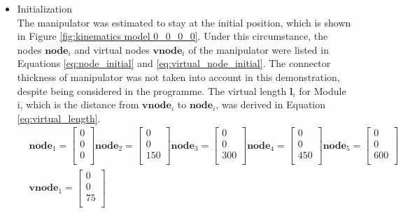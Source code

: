 \begin{itemize}
    \item Initialization \\
    The manipulator was estimated to stay at the initial position, which is shown in Figure 
    \ref{fig:kinematics model 0_0_0_0}. Under this circumstance, the nodes $\textbf{node}_{i}$ and 
    virtual nodes $\textbf{vnode}_{i}$ of the manipulator were listed in Equations \ref{eq:node_initial} and 
    \ref{eq:virtual_node_initial}. The connector thickness of manipulator was not taken into account in this 
    demonstration, despite being considered in the programme. The virtual length $\textbf{l}_{i}$ for Module i, which 
    is the distance from $\textbf{vnode}_{i}$ to $\textbf{node}_{i}$, was derived in Equation 
    \ref{eq:virtual_length}.
    \begin{align}
        & \textbf{node}_{1} = \begin{bmatrix} 0 \\ 0 \\ 0 \\ \end{bmatrix} 
        \textbf{node}_{2} = \begin{bmatrix} 0 \\ 0 \\ 150 \\ \end{bmatrix} 
        \textbf{node}_{3} = \begin{bmatrix} 0 \\ 0 \\ 300 \\ \end{bmatrix} 
        \textbf{node}_{4} = \begin{bmatrix} 0 \\ 0 \\ 450 \\ \end{bmatrix} 
        \textbf{node}_{5} = \begin{bmatrix} 0 \\ 0 \\ 600 \\ \end{bmatrix} 
        \label{eq:node_initial} \\
        &\textbf{vnode}_{1} = \begin{bmatrix} 0 \\ 0 \\ 75 \\ \end{bmatrix} 

\end{align}
\end{itemize}
